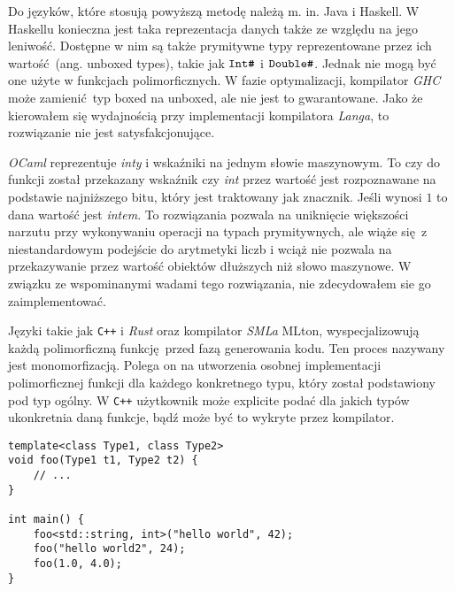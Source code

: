 \documentclass[declaration,shortabstract]{iithesis}
\begin{document}
Do języków, które stosują powyższą metodę należą m. in. Java i Haskell.
W Haskellu konieczna jest taka reprezentacja danych także ze względu na jego 
leniwość. Dostępne w nim są także prymitywne typy reprezentowane przez 
ich wartość (ang. unboxed types), takie jak $\verb!Int#!$ i 
$\verb!Double#!$. Jednak nie mogą być one użyte w funkcjach polimorficznych. 
W fazie optymalizacji, kompilator \textit{GHC} może zamienić typ boxed 
na unboxed, ale nie jest to gwarantowane. Jako że kierowałem się wydajnością
przy implementacji kompilatora \textit{Langa}, to rozwiązanie nie jest 
satysfakcjonujące.

\textit{OCaml} reprezentuje \textit{inty} i wskaźniki na jednym słowie 
maszynowym. To czy do funkcji został przekazany wskaźnik czy \textit{int}
przez wartość jest rozpoznawane na podstawie najniższego bitu, który jest 
traktowany jak znacznik. Jeśli wynosi $1$ to dana wartość jest \textit{intem}.
To rozwiązania pozwala na uniknięcie większości narzutu przy wykonywaniu 
operacji na typach prymitywnych, ale wiąże się z niestandardowym podejście do 
arytmetyki liczb i wciąż nie pozwala na przekazywanie przez wartość obiektów 
dłuższych niż słowo maszynowe. W związku ze wspominanymi wadami tego 
rozwiązania, nie zdecydowałem sie go zaimplementować.

Języki takie jak \texttt{C++} i \textit{Rust} oraz kompilator \textit{SMLa} 
MLton, wyspecjalizowują każdą polimorficzną funkcję przed fazą generowania 
kodu. Ten proces nazywany jest monomorfizacją. Polega on na utworzenia osobnej 
implementacji polimorficznej funkcji dla każdego konkretnego typu, który został 
podstawiony pod typ ogólny. W \texttt{C++} użytkownik może explicite podać 
dla jakich typów ukonkretnia daną funkcje, bądź może być to wykryte przez 
kompilator.

\begin{lstlisting}[frame=single, caption={Polimorficzna funkcja w 
\texttt{C++} z użyciem szablonów (ang. template)}]
template<class Type1, class Type2>
void foo(Type1 t1, Type2 t2) {
    // ...
}

int main() {
    foo<std::string, int>("hello world", 42);
    foo("hello world2", 24);
    foo(1.0, 4.0);
}
\end{lstlisting}
\end{document}
